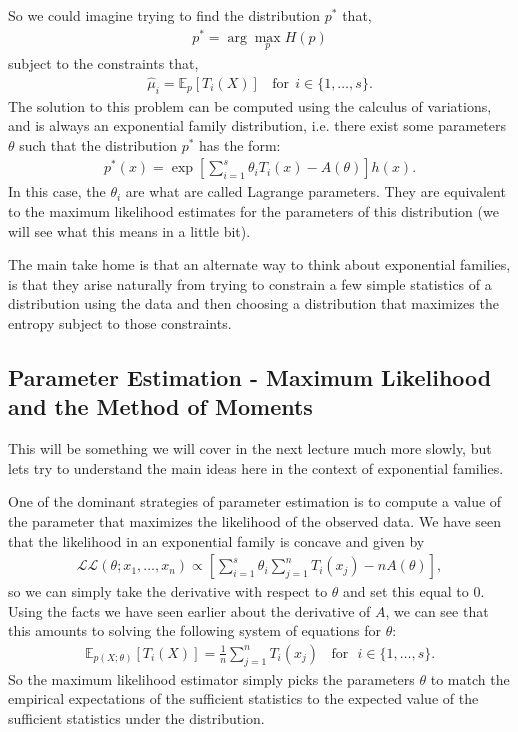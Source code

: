 \documentclass[twoside,12pt]{article}
\begin{document}
So we could imagine trying to find the distribution $p^*$ that,
\begin{align*}
p^* = \arg \max_p H(p)
\end{align*}
subject to the constraints that,
\begin{align*}
\widehat{\mu}_i = \mathbb{E}_{p} [T_i(X)]~~~~\text{for}~~i \in \{1,\ldots,s\}.
\end{align*}
The solution to this problem can be computed using the calculus of variations, and is always an exponential family distribution, i.e. there exist some parameters $\theta$ such that the distribution $p^*$ has the form:
\begin{align*}
p^*(x) = \exp \left[ \sum_{i=1}^s \theta_i T_i(x) - A(\theta)\right] h(x).
\end{align*}
In this case, the $\theta_i$ are what are called Lagrange parameters. They are equivalent to the maximum likelihood estimates for the parameters of this distribution (we will see what this means in a little bit).

The main take home is that an alternate way to think about exponential families, is that they arise naturally from trying to constrain a few simple statistics of a distribution using the data and then choosing a distribution that maximizes the entropy subject to those constraints.

\subsection{Parameter Estimation - Maximum Likelihood and the Method of Moments}
This will be something we will cover in the next lecture much more slowly, but lets try to understand the main ideas here in the context of exponential families.

One of the dominant strategies of parameter estimation is to compute a value of the parameter that maximizes the likelihood of the observed data. We have seen that the likelihood in an exponential family is concave and given by
\begin{align*}
\mathcal{L}\mathcal{L}(\theta;x_1,\ldots,x_n) \propto \left[ \sum_{i=1}^s \theta_i \sum_{j=1}^n T_i(x_j) - n A(\theta)\right],
\end{align*}
so we can simply take the derivative with respect to $\theta$ and set this equal to $0$. Using the facts we have seen earlier about the derivative of $A$, we can see that this amounts to solving the following system of equations for $\theta$:
\begin{align*}
\mathbb{E}_{p(X;\theta)} [T_i(X)] = \frac{1}{n} \sum_{j=1}^n T_i(x_j)~~~~\text{for}~~~i \in \{1,\ldots,s\}.
\end{align*}
So the maximum likelihood estimator simply picks the parameters $\theta$ to match the empirical expectations of the sufficient statistics to the expected value of the sufficient statistics under the distribution.
\end{document}
